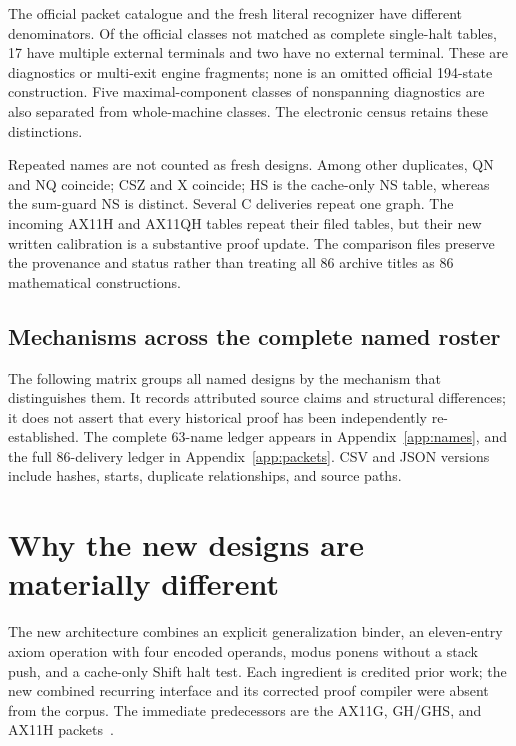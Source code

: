 The official packet catalogue and the fresh literal recognizer have
different denominators. Of the official classes not matched as complete
single-halt tables, 17 have multiple external terminals and two have no
external terminal. These are diagnostics or multi-exit engine fragments;
none is an omitted official 194-state construction. Five maximal-component
classes of nonspanning diagnostics are also separated from whole-machine
classes. The electronic census retains these distinctions.

Repeated names are not counted as fresh designs. Among other duplicates,
QN and NQ coincide; CSZ and X coincide; HS is the cache-only NS table,
whereas the sum-guard NS is distinct. Several C deliveries repeat one
graph. The incoming AX11H and AX11QH tables repeat their filed tables,
but their new written calibration is a substantive proof update. The
comparison files preserve the provenance and status rather than treating
all 86 archive titles as 86 mathematical constructions.

\subsection{Mechanisms across the complete named roster}

The following matrix groups all named designs by the mechanism that
distinguishes them. It records attributed source claims and structural
differences; it does not assert that every historical proof has been
independently re-established. The complete 63-name ledger appears in
Appendix~\ref{app:names}, and the full 86-delivery ledger in
Appendix~\ref{app:packets}. CSV and JSON versions include hashes, starts,
duplicate relationships, and source paths.

\begingroup\small

\endgroup

\section{Why the new designs are materially different}

The new architecture combines an explicit generalization binder,
an eleven-entry axiom operation with four encoded operands,
modus ponens without a stack push, and a cache-only Shift halt test.
Each ingredient is credited prior work; the new combined recurring
interface and its corrected proof compiler were absent from the corpus.
The immediate predecessors are the AX11G, GH/GHS, and AX11H packets~\cite{ax11g,gh,ax11h}.

